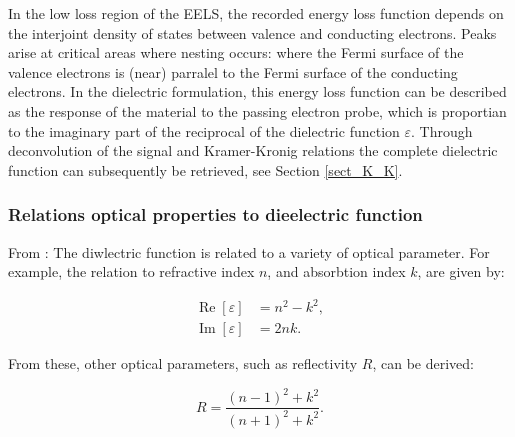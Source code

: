 In the low loss region of the EELS, the recorded energy loss function depends on the interjoint density of states between valence and conducting electrons. Peaks arise at critical areas where nesting occurs: where the Fermi surface of the valence electrons is (near) parralel to the Fermi surface of the conducting electrons. In the dielectric formulation, this energy loss function can be described as the response of the material to the passing electron probe, which is proportian to the imaginary part of the reciprocal of the dielectric function $\varepsilon$. Through deconvolution of the signal and Kramer-Kronig relations the complete dielectric function can subsequently be retrieved, see Section \ref{sect_K_K}.





\subsubsection{Relations optical properties to dieelectric function}
From \cite{brockt_lakner_2000}:
The diwlectric function is related to a variety of optical parameter. For example, the relation to refractive index $n$, and absorbtion index $k$, are given by:

\begin{equation}
\begin{aligned}
	\operatorname{Re}[\varepsilon]&=n^{2}-k^{2},\\
	\operatorname{Im}[\varepsilon]&=2 n k.
\end{aligned}
\end{equation}

From these, other optical parameters, such as reflectivity $R$, can be derived:

\begin{equation}
R=\frac{(n-1)^{2}+k^{2}}{(n+1)^{2}+k^{2}}.
\end{equation}
